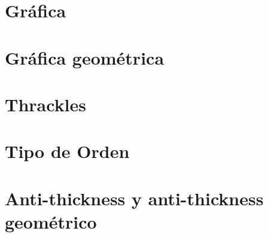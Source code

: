 \section{Gráfica}
\section{Gráfica geométrica}
\section{Thrackles}
\section{Tipo de Orden}
\section{Anti-thickness y anti-thickness geométrico}
